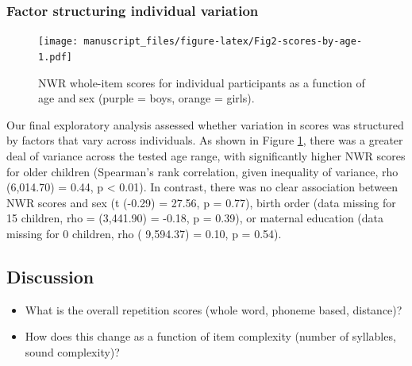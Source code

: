 \documentclass[english,,man,floatsintext]{apa6}
\begin{document}
\subsubsection{Factor structuring individual
variation}\label{factor-structuring-individual-variation}

\begin{figure}
\centering
\texttt{[image: manuscript\_files/figure-latex/Fig2-scores-by-age-1.pdf]}
\caption{\label{fig:Fig2-scores-by-age}NWR whole-item scores for individual
participants as a function of age and sex (purple = boys, orange =
girls).}
\end{figure}

Our final exploratory analysis assessed whether variation in scores was
structured by factors that vary across individuals. As shown in Figure
\ref{fig:Fig2-scores-by-age}, there was a greater deal of variance
across the tested age range, with significantly higher NWR scores for
older children (Spearman's rank correlation, given inequality of
variance, rho (6,014.70) = 0.44, p \textless{} 0.01). In contrast, there
was no clear association between NWR scores and sex (t (-0.29) = 27.56,
p = 0.77), birth order (data missing for 15 children, rho = (3,441.90) =
-0.18, p = 0.39), or maternal education (data missing for 0 children,
rho ( 9,594.37) = 0.10, p = 0.54).

\subsection{Discussion}\label{discussion}

\begin{itemize}
\item
  What is the overall repetition scores (whole word, phoneme based,
  distance)?
\item
  How does this change as a function of item complexity (number of
  syllables, sound complexity)?
\end{itemize}
\end{document}
